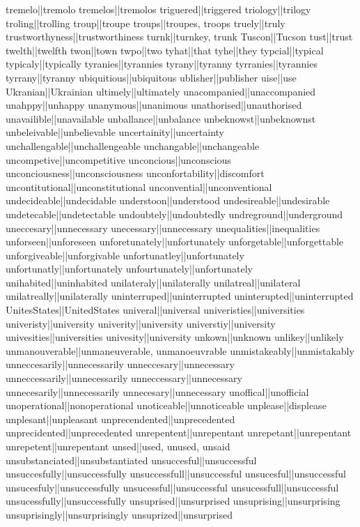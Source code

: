 tremelo||tremolo
tremelos||tremolos
triguered||triggered
triology||trilogy
troling||trolling
troup||troupe
troups||troupes, troops
truely||truly
trustworthyness||trustworthiness
turnk||turnkey, trunk
Tuscon||Tucson
tust||trust
twelth||twelfth
twon||town
twpo||two
tyhat||that
tyhe||they
typcial||typical
typicaly||typically
tyranies||tyrannies
tyrany||tyranny
tyrranies||tyrannies
tyrrany||tyranny
ubiquitious||ubiquitous
ublisher||publisher
uise||use
Ukranian||Ukrainian
ultimely||ultimately
unacompanied||unaccompanied
unahppy||unhappy
unanymous||unanimous
unathorised||unauthorised
unavailible||unavailable
unballance||unbalance
unbeknowst||unbeknownst
unbeleivable||unbelievable
uncertainity||uncertainty
unchallengable||unchallengeable
unchangable||unchangeable
uncompetive||uncompetitive
unconcious||unconscious
unconciousness||unconsciousness
unconfortability||discomfort
uncontitutional||unconstitutional
unconvential||unconventional
undecideable||undecidable
understoon||understood
undesireable||undesirable
undetecable||undetectable
undoubtely||undoubtedly
undreground||underground
uneccesary||unnecessary
unecessary||unnecessary
unequalities||inequalities
unforseen||unforeseen
unforetunately||unfortunately
unforgetable||unforgettable
unforgiveable||unforgivable
unfortunatley||unfortunately
unfortunatly||unfortunately
unfourtunately||unfortunately
unihabited||uninhabited
unilateraly||unilaterally
unilatreal||unilateral
unilatreally||unilaterally
uninterruped||uninterrupted
uninterupted||uninterrupted
UnitesStates||UnitedStates
univeral||universal
univeristies||universities
univeristy||university
univerity||university
universtiy||university
univesities||universities
univesity||university
unkown||unknown
unlikey||unlikely
unmanouverable||unmaneuverable, unmanoeuvrable
unmistakeably||unmistakably
unneccesarily||unnecessarily
unneccesary||unnecessary
unneccessarily||unnecessarily
unneccessary||unnecessary
unnecesarily||unnecessarily
unnecesary||unnecessary
unoffical||unofficial
unoperational||nonoperational
unoticeable||unnoticeable
unplease||displease
unplesant||unpleasant
unprecendented||unprecedented
unprecidented||unprecedented
unrepentent||unrepentant
unrepetant||unrepentant
unrepetent||unrepentant
unsed||used, unused, unsaid
unsubstanciated||unsubstantiated
unsuccesful||unsuccessful
unsuccesfully||unsuccessfully
unsuccessfull||unsuccessful
unsucesful||unsuccessful
unsucesfuly||unsuccessfully
unsucessful||unsuccessful
unsucessfull||unsuccessful
unsucessfully||unsuccessfully
unsuprised||unsurprised
unsuprising||unsurprising
unsuprisingly||unsurprisingly
unsuprized||unsurprised
